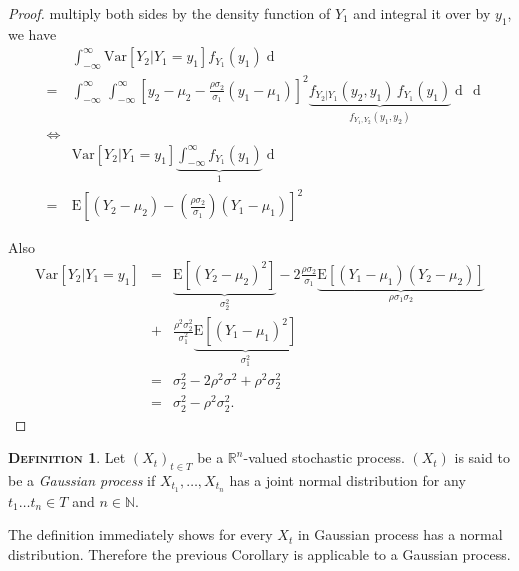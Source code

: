 \documentclass[a4paper, twoside, 11pt]{article}
\theoremstyle{definition}
\newtheorem{definition}{\scshape Definition}[section]
\newcommand{\sqbr}[1]{\left[ {#1} \right]}
\begin{document}
\begin{proof}
  multiply both sides by the density function of $Y_1$ and integral it over by $y_1$, we have
\begin{eqnarray*}
 &\,&\int_{-\infty}^{\infty} \mathrm{Var}[Y_2|Y_1=y_1] f_{Y_1}(y_1) \mathop{dy_1} \\
 &=&\int_{-\infty}^{\infty}\,\int_{-\infty}^{\infty} \sqbr{y_2 - \mu_2 
	- \frac{\rho\sigma_2}{\sigma_1}(y_1-\mu_1)}^2\underbrace{f_{Y_2|Y_1}(y_2, y_1)\,f_{Y_1}(y_1)}_{f_{Y_1, Y_2}(y_1, y_2)} \mathop{dy_2}\,\mathop{dy_1}\\
	&\iff&\\
	&\,&\mathrm{Var}[Y_2|Y_1=y_1] \underbrace{\int_{-\infty}^{\infty}  f_{Y_1}(y_1)}_{1} \mathop{dy_1} \\
	&=& \mathrm{E}\sqbr{(Y_2 - \mu_2) - (\frac{\rho\sigma_2}{\sigma_1})(Y_1 - \mu_1)}^2 
\end{eqnarray*}

Also
\begin{eqnarray*}
  \mathrm{Var}[Y_2|Y_1=y_1] &=&\underbrace{\mathrm{E}[(Y_2 - \mu_2)^2]}_{\sigma_2^2} - 2\frac{\rho\sigma_2}{\sigma_1}\underbrace{\mathrm{E}[(Y_1 -\mu_1)(Y_2 - \mu_2)]}_{\rho\sigma_1\sigma_2}\\
  &+& \frac{\rho^2\sigma_2^2}{\sigma_1^2}\underbrace{\mathrm{E}[(Y_1-\mu_1)^2]}_{\sigma_1^2}\\
  &=& \sigma_2^2 - 2\rho^2\sigma^2 + \rho^2\sigma_2^2\\
  &=& \sigma_2^2 - \rho^2\sigma_2^2.
\end{eqnarray*} 
\end{proof}

\begin{definition}
  Let $(X_t)_{t \in T}$ be a $\mathbb{R}^{n}$-valued stochastic process. $(X_t)$ is said to be a \emph{Gaussian process} if $X_{t_1},\dots, X_{t_n}$ has a joint normal distribution for any  $t_1 \dots t_n \in T$ and $n \in \mathbb{N}$. 
\end{definition}
The definition immediately shows for every $X_t$ in Gaussian process has a normal distribution. Therefore the previous Corollary is applicable to a Gaussian process.
\end{document}
